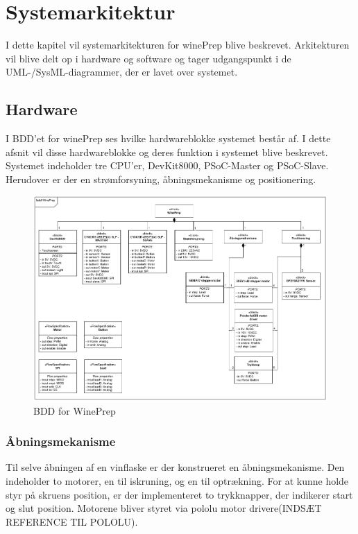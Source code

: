\section{Systemarkitektur}
I dette kapitel vil systemarkitekturen for winePrep blive beskrevet. Arkitekturen vil blive delt op i hardware og software og tager udgangspunkt 
i de UML-/SysML-diagrammer, der er lavet over systemet. 

\subsection{Hardware}
I BDD'et for winePrep ses hvilke hardwareblokke systemet består af. I dette afsnit vil disse hardwareblokke og deres funktion i systemet blive beskrevet.
Systemet indeholder tre CPU'er, DevKit8000, PSoC-Master og PSoC-Slave. Herudover er der en strømforsyning, åbningsmekanisme og positionering. \\

\begin{figure}[H]
	\includegraphics[scale=0.33]{tex/Arkitektur/Fotos/HW/BDD_winePrep}
	\caption{BDD for WinePrep}
\end{figure}

\subsubsection{Åbningsmekanisme}
Til selve åbningen af en vinflaske er der konstrueret en åbningsmekanisme. Den indeholder to motorer, en til iskruning, og en til optrækning.
For at kunne holde styr på skruens position, er der implementeret to trykknapper, der indikerer start og slut position. Motorene bliver styret via 
pololu motor drivere(INDSÆT REFERENCE TIL POLOLU). \\   

